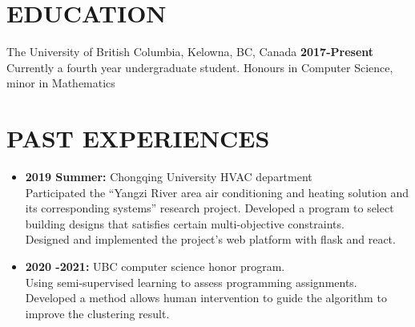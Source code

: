 \documentclass{res}
\begin{document}

\address{\textbf{Email:} jimmy123good@hotmail.com \\
        \textbf{Github: }https://github.com/ailrk \\
         \textbf{Blog:}    https://ailrk.github.io/home \\
         \textbf{Contact:}  (250) 899 2600}
\begin{resume}

\section{EDUCATION}
The University of British Columbia, Kelowna, BC, Canada  \hspace{1.2in} \textbf{2017-Present}\\
    Currently a fourth year undergraduate student. Honours in Computer Science, minor in Mathematics \\

\section{PAST EXPERIENCES}
\begin{itemize}[leftmargin=-.1in]
    \item \textbf{2019 Summer:} Chongqing University HVAC department
        \vspace{0.05in}\\ Participated the ``Yangzi River area air conditioning and heating solution and its corresponding systems'' research project. Developed a program to select building designs that satisfies certain multi-objective constraints. \\
     Designed and implemented the project's web platform with flask and react. \\
    \item \textbf{2020 -2021: } UBC computer science honor program. \\
        \vspace{0.05in} Using semi-supervised learning to assess programming assignments. Developed a method allows human intervention to guide the algorithm to improve the clustering result. \\


\end{itemize}


\end{resume}
\end{document}
